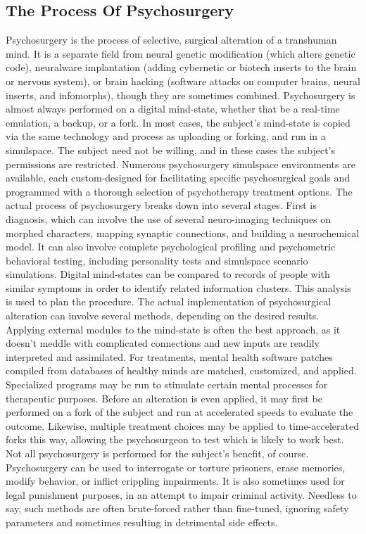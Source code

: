 \subsection{The Process Of Psychosurgery} Psychosurgery is the process of selective, surgical alteration of a transhuman mind. It is a separate field from neural genetic modification (which alters genetic code), neuralware implantation (adding cybernetic or biotech inserts to the brain or nervous system), or brain hacking (software attacks on computer brains, neural inserts, and infomorphs), though they are sometimes combined. Psychosurgery is almost always performed on a digital mind-state, whether that be a real-time emulation, a backup, or a fork. In most cases, the subject’s mind-state is copied via the same technology and process as uploading or forking, and run in a simulspace. The subject need not be willing, and in these cases the subject’s permissions are restricted. Numerous psychosurgery simulspace environments are available, each custom-designed for facilitating specific psychosurgical goals and programmed with a thorough selection of psychotherapy treatment options. The actual process of psychosurgery breaks down into several stages. First is diagnosis, which can involve the use of several neuro-imaging techniques on morphed characters, mapping synaptic connections, and building a neurochemical model. It can also involve complete psychological profiling and psychometric behavioral testing, including personality tests and simulspace scenario simulations. Digital mind-states can be compared to records of people with similar symptoms in order to identify related information clusters. This analysis is used to plan the procedure. The actual implementation of psychosurgical alteration can involve several methods, depending on the desired results. Applying external modules to the mind-state is often the best approach, as it doesn’t meddle with complicated connections and new inputs are readily interpreted and assimilated. For treatments, mental health software patches compiled from databases of healthy minds are matched, customized, and applied. Specialized programs may be run to stimulate certain mental processes for therapeutic purposes. Before an alteration is even applied, it may first be performed on a fork of the subject and run at accelerated speeds to evaluate the outcome. Likewise, multiple treatment choices may be applied to time-accelerated forks this way, allowing the psychosurgeon to test which is likely to work best. Not all psychosurgery is performed for the subject’s benefit, of course. Psychosurgery can be used to interrogate or torture prisoners, erase memories, modify behavior, or inflict crippling impairments. It is also sometimes used for legal punishment purposes, in an attempt to impair criminal activity. Needless to say, such methods are often brute-forced rather than fine-tuned, ignoring safety parameters and sometimes resulting in detrimental side effects. 



